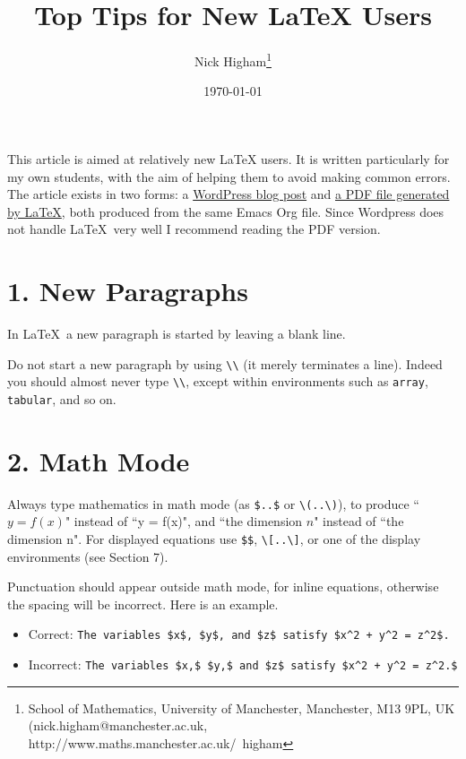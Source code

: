 \documentclass[12pt]{extarticle}
\author{Nick Higham\footnote{School of Mathematics, University of Manchester, Manchester, M13 9PL, UK (nick.higham@manchester.ac.uk, http://www.maths.manchester.ac.uk/\string~higham}}
\date{\today}
\title{Top Tips for New \LaTeX{} Users}
\begin{document}
\maketitle


\label{sec-1}
This article is aimed at relatively new \LaTeX{} users.
It is written particularly for my own students, with the aim of helping them
to avoid making common errors.
The article exists in two forms: a \href{https://nickhigham.wordpress.com/2015/09/29/top-tips-for-new-latex-users/}{WordPress blog post} and \href{https://github.com/higham/latex-tips}{a PDF file
generated by \LaTeX}, both produced from the same Emacs Org file.  Since
Wordpress does not handle \LaTeX\ very well I recommend reading the PDF
version.

\section*{1. New Paragraphs}
\label{sec-2}
In \LaTeX\ a new paragraph is started  by leaving a blank line.

Do not start a new paragraph by using \texttt{\textbackslash{}\textbackslash{}}
(it merely terminates a line).
Indeed you should almost never type \texttt{\textbackslash{}\textbackslash{}}, except within 
environments such as \texttt{array}, \texttt{tabular}, and so on.

\section*{2. Math Mode}
\label{sec-3}
Always type mathematics in math mode (as \texttt{\$..\$} or \texttt{\textbackslash{}(..\textbackslash{})}), 
to produce ``$y = f(x)$" instead of ``y = f(x)",
and ``the dimension $n$"
instead of ``the dimension n".
For displayed equations use \texttt{\$\$}, \texttt{\textbackslash{}[..\textbackslash{}]}, or one of the display
environments (see Section 7).

Punctuation should appear outside math mode, for inline equations,
otherwise the spacing will be
incorrect. Here is an example.


\begin{itemize}
\item Correct: \texttt{The variables \$x\$, \$y\$, and \$z\$ satisfy \$x\textasciicircum{}2 + y\textasciicircum{}2 = z\textasciicircum{}2\$.}
\item Incorrect: \texttt{The variables \$x,\$ \$y,\$ and \$z\$ satisfy \$x\textasciicircum{}2 + y\textasciicircum{}2 = z\textasciicircum{}2.\$}
\end{itemize}
\end{document}
